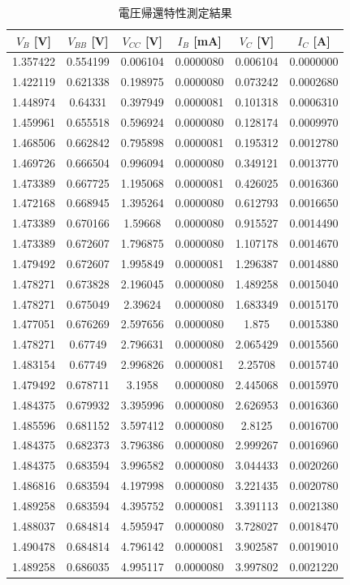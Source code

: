 \documentclass[11pt,dvipdfmx]{jarticle}
\begin{document}
		\begin{table}[H]
			\centering
			\caption{電圧帰還特性測定結果}
			\begin{tabular}{cccccc}
			\hline
			$V_B$ [V]& $V_{BB}$ [V]& $V_{CC}$ [V]& $I_B$ [mA]& $V_C$ [V]& $I_C$ [A]\\\hline\hline
			1.357422 & 0.554199 & 0.006104 & 0.0000080 & 0.006104 & 0.0000000 \\
			1.422119 & 0.621338 & 0.198975 & 0.0000080 & 0.073242 & 0.0002680 \\
			1.448974 & 0.64331 & 0.397949 & 0.0000081 & 0.101318 & 0.0006310 \\
			1.459961 & 0.655518 & 0.596924 & 0.0000080 & 0.128174 & 0.0009970 \\
			1.468506 & 0.662842 & 0.795898 & 0.0000081 & 0.195312 & 0.0012780 \\
			1.469726 & 0.666504 & 0.996094 & 0.0000080 & 0.349121 & 0.0013770 \\
			1.473389 & 0.667725 & 1.195068 & 0.0000081 & 0.426025 & 0.0016360 \\
			1.472168 & 0.668945 & 1.395264 & 0.0000080 & 0.612793 & 0.0016650 \\
			1.473389 & 0.670166 & 1.59668 & 0.0000080 & 0.915527 & 0.0014490 \\
			1.473389 & 0.672607 & 1.796875 & 0.0000080 & 1.107178 & 0.0014670 \\
			1.479492 & 0.672607 & 1.995849 & 0.0000081 & 1.296387 & 0.0014880 \\
			1.478271 & 0.673828 & 2.196045 & 0.0000080 & 1.489258 & 0.0015040 \\
			1.478271 & 0.675049 & 2.39624 & 0.0000080 & 1.683349 & 0.0015170 \\
			1.477051 & 0.676269 & 2.597656 & 0.0000080 & 1.875 & 0.0015380 \\
			1.478271 & 0.67749 & 2.796631 & 0.0000080 & 2.065429 & 0.0015560 \\
			1.483154 & 0.67749 & 2.996826 & 0.0000081 & 2.25708 & 0.0015740 \\
			1.479492 & 0.678711 & 3.1958 & 0.0000080 & 2.445068 & 0.0015970 \\
			1.484375 & 0.679932 & 3.395996 & 0.0000080 & 2.626953 & 0.0016360 \\
			1.485596 & 0.681152 & 3.597412 & 0.0000080 & 2.8125 & 0.0016700 \\
			1.484375 & 0.682373 & 3.796386 & 0.0000080 & 2.999267 & 0.0016960 \\
			1.484375 & 0.683594 & 3.996582 & 0.0000080 & 3.044433 & 0.0020260 \\
			1.486816 & 0.683594 & 4.197998 & 0.0000080 & 3.221435 & 0.0020780 \\
			1.489258 & 0.683594 & 4.395752 & 0.0000081 & 3.391113 & 0.0021380 \\
			1.488037 & 0.684814 & 4.595947 & 0.0000080 & 3.728027 & 0.0018470 \\
			1.490478 & 0.684814 & 4.796142 & 0.0000081 & 3.902587 & 0.0019010 \\
			1.489258 & 0.686035 & 4.995117 & 0.0000080 & 3.997802 & 0.0021220 \\
			\hline
			\end{tabular}
			\label{tab:電圧帰還特性測定結果}
		\end{table}
\end{document}

